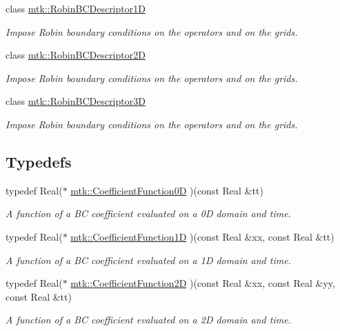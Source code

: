 \begin{DoxyCompactItemize}
class \hyperlink{classmtk_1_1RobinBCDescriptor1D}{mtk\+::\+Robin\+B\+C\+Descriptor1\+D}
\begin{DoxyCompactList}\small\item\em Impose Robin boundary conditions on the operators and on the grids. \end{DoxyCompactList}\item 
class \hyperlink{classmtk_1_1RobinBCDescriptor2D}{mtk\+::\+Robin\+B\+C\+Descriptor2\+D}
\begin{DoxyCompactList}\small\item\em Impose Robin boundary conditions on the operators and on the grids. \end{DoxyCompactList}\item 
class \hyperlink{classmtk_1_1RobinBCDescriptor3D}{mtk\+::\+Robin\+B\+C\+Descriptor3\+D}
\begin{DoxyCompactList}\small\item\em Impose Robin boundary conditions on the operators and on the grids. \end{DoxyCompactList}\end{DoxyCompactItemize}
\subsection*{Typedefs}
\begin{DoxyCompactItemize}
\item 
typedef Real($\ast$ \hyperlink{group__c07-mim__ops_ga04276745b4d511f0f3c636d6e0df7c2d}{mtk\+::\+Coefficient\+Function0\+D} )(const Real \&tt)
\begin{DoxyCompactList}\small\item\em A function of a B\+C coefficient evaluated on a 0\+D domain and time. \end{DoxyCompactList}\item 
typedef Real($\ast$ \hyperlink{group__c07-mim__ops_gaa79593eeb6676d6011db339e01983909}{mtk\+::\+Coefficient\+Function1\+D} )(const Real \&xx, const Real \&tt)
\begin{DoxyCompactList}\small\item\em A function of a B\+C coefficient evaluated on a 1\+D domain and time. \end{DoxyCompactList}\item 
typedef Real($\ast$ \hyperlink{group__c07-mim__ops_ga0ff293d1fd754006d64a3588971dc5c4}{mtk\+::\+Coefficient\+Function2\+D} )(const Real \&xx, const Real \&yy, const Real \&tt)
\begin{DoxyCompactList}\small\item\em A function of a B\+C coefficient evaluated on a 2\+D domain and time. \end{DoxyCompactList}\end{DoxyCompactItemize}


